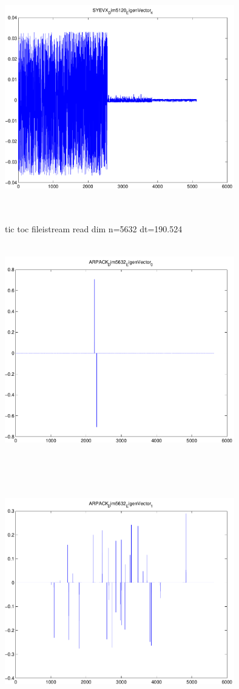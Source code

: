 \documentclass[9pt]{article}
\theoremstyle{plain}
\theoremstyle{definition}
\theoremstyle{remark}
\numberwithin{equation}{section}
\begin{document}
\includegraphics[width=10.0cm,height=10.0cm]{SYEVX_Dim5120_EigenVector_4.pdf}

tic toc fileistream read dim n=5632 dt=190.524
\includegraphics[width=10.0cm,height=10.0cm]{ARPACK_Dim5632_EigenVector_0.pdf}

\includegraphics[width=10.0cm,height=10.0cm]{ARPACK_Dim5632_EigenVector_1.pdf}
\end{document}
